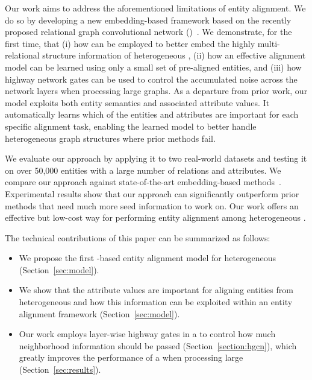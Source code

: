 Our work aims to address the aforementioned limitations of entity alignment. We do so by developing a new embedding-based framework based
on the recently proposed relational graph convolutional network (\RGCN)~\cite{Schlichtkrull2017Modeling}. We demonstrate, for the first
time, that (i) how \RGCNs can be employed to better embed the highly multi-relational structure information of heterogeneous \KGs, (ii) how
an effective alignment model can be learned using only a small set of pre-aligned entities, and (iii) how highway network gates can be used
to control the accumulated noise across the network layers when processing large graphs. As a departure from prior work, our model exploits
both entity semantics and associated attribute values. It automatically learns which of the entities and attributes are important for each
specific alignment task, enabling the learned model to better handle heterogeneous graph structures where prior methods fail.

We evaluate our approach by applying it to two real-world datasets and testing it on over 50,000 entities with a large number of relations
and attributes. We compare our approach against state-of-the-art embedding-based
methods~\cite{hao2016joint,chen2016multilingual,sun2017cross,zhu2017iterative}. Experimental results show that our approach can
significantly outperform prior methods that need much more seed information to work on. Our work offers an effective but low-cost way for
performing entity alignment among heterogeneous \KGs.



	
	The technical contributions of this paper can be summarized as follows:
	\begin{itemize}
		\item We propose the first \RGCN-based entity alignment model for heterogeneous \KGs (Section~\ref {sec:model}).
		
        \item We show that the attribute values are important for aligning entities from heterogeneous \KGs and how this information can
            be exploited within an entity alignment framework (Section~\ref{sec:model}).

		\item Our work employs layer-wise highway gates in a \RGCN to control how much neighborhood information should be
passed (Section~\ref{section:hgcn}), which greatly improves the performance of a \RGCN when processing
large \KGs (Section~\ref{sec:results}).
		
		
	\end{itemize}
